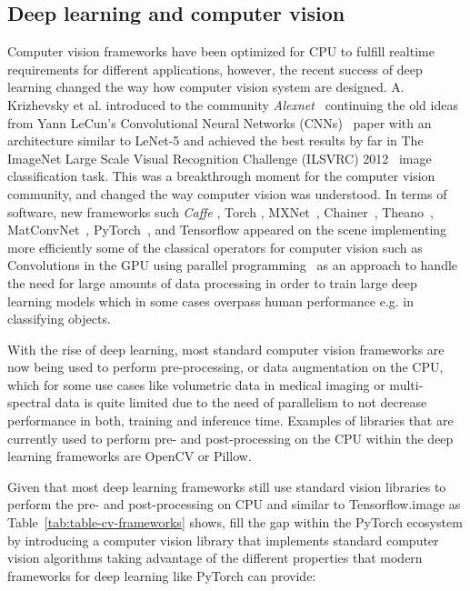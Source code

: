 \subsection{Deep learning and computer vision}
\label{section:related_work:deep_learning}
Computer vision frameworks have been optimized for CPU to fulfill realtime requirements for different applications, however, the recent success of deep learning changed the way how computer vision system are designed. A. Krizhevsky et al. introduced to the community \textit{Alexnet}~\citep{AlexNet2012} continuing the old ideas from Yann LeCun's Convolutional Neural Networks (CNNs)~\citep{MNIST1998} paper with an architecture similar to LeNet-5 and achieved the best results by far in The ImageNet Large Scale Visual Recognition Challenge (ILSVRC)  2012~\citep{ILSVRC15} image classification task. This was a breakthrough moment for the computer vision community, and changed the way computer vision was understood. In terms of software, new frameworks such \textit{Caffe} \citep{caffe}, Torch \citep{torch7}, MXNet~\citep{journals/corr/ChenLLLWWXXZZ15}, Chainer~\citep{Tokui:2019:CDL:3292500.3330756}, Theano~\citep{Bergstra10theano}, MatConvNet~\citep{Vedaldi15}, PyTorch~\citep{pytorch}, and Tensorflow \citep{tensorflow2015-whitepaper} appeared on the scene implementing more efficiently some of the classical operators for computer vision such as Convolutions in the GPU using parallel programming~\citep{CookCUDA} as an approach to handle the need for large amounts of data processing in order to train large deep learning models which in some cases overpass human performance e.g. in classifying objects.

With the rise of deep learning, most standard computer vision frameworks are now being used to perform pre-processing, or data augmentation on the CPU, which for some use cases like volumetric data in medical imaging or multi-spectral data is quite limited due to the need of parallelism to not decrease performance in both, training and inference time. Examples of libraries that are currently used to perform pre- and post-processing on the CPU within the deep learning frameworks are OpenCV or Pillow.

Given that most  deep learning frameworks still use standard vision libraries to perform the pre- and post-processing on CPU and similar to Tensorflow.image {as Table~\ref{tab:table-cv-frameworks} shows, \lib{} fill the gap} within the PyTorch ecosystem by introducing a computer vision library that implements standard computer vision algorithms taking advantage of the different properties that modern frameworks for deep learning like PyTorch can provide:

